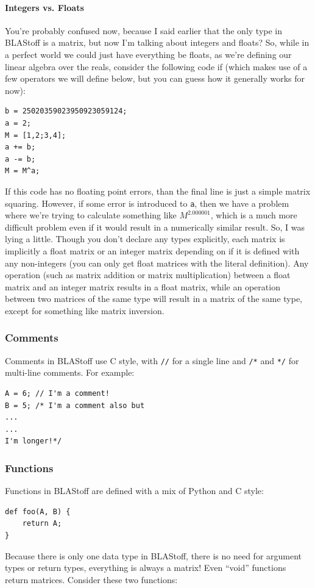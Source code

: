 \paragraph{Integers vs. Floats}
You're probably confused now, because I said earlier that the only type in BLAStoff is a matrix, but now I'm talking about integers and floats?  So, while in a perfect world we could just have everything be floats, as we're defining our linear algebra over the reals, consider the following code if (which makes use of a few operators we will define below, but you can guess how it generally works for now):
\begin{lstlisting}
b = 25020359023950923059124;
a = 2;
M = [1,2;3,4];
a += b;
a -= b;
M = M^a;
\end{lstlisting}
If this code has no floating point errors, than the final line is just a simple matrix squaring.  However, if some error is introduced to \verb=a=, then we have a problem where we're trying to calculate something like $M^{2.000001}$, which is a much more difficult problem even if it would result in a numerically similar result.  So, I was lying a little.  Though you don't declare any types explicitly, each matrix is implicitly a float matrix or an integer matrix depending on if it is defined with any non-integers (you can only get float matrices with the literal definition).  Any operation (such as matrix addition or matrix multiplication) between a float matrix and an integer matrix results in a float matrix, while an operation between two matrices of the same type will result in a matrix of the same type, except for something like matrix inversion.


\subsubsection{Comments}
Comments in BLAStoff use C style, with \verb=//= for a single line and \verb=/*= and \verb=*/= for multi-line comments.  For example:
\begin{lstlisting}
A = 6; // I'm a comment!
B = 5; /* I'm a comment also but
...
...
I'm longer!*/
\end{lstlisting}

\subsubsection{Functions}
Functions in BLAStoff are defined with a mix of Python and C style:
\begin{lstlisting}
def foo(A, B) {
    return A;
}
\end{lstlisting}
Because there is only one data type in BLAStoff, there is no need for argument types or return types, everything is always a matrix!  Even ``void'' functions return matrices.  Consider these two functions:

